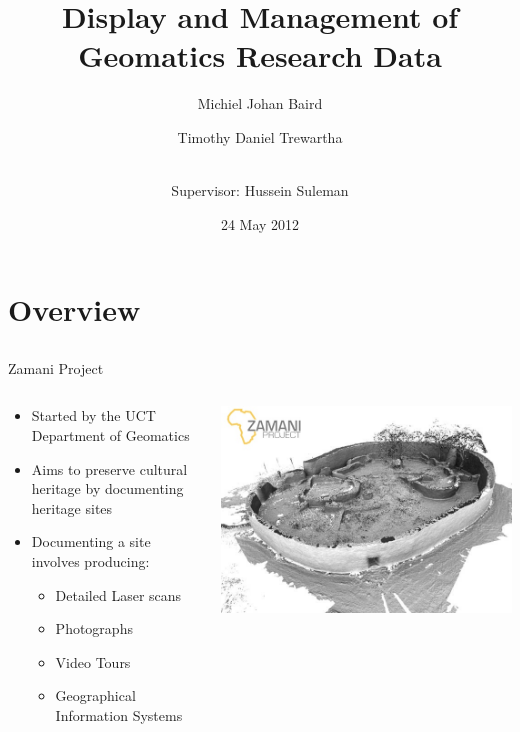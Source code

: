 \documentclass{beamer}
\title[Display and Management]{Display and Management of Geomatics Research Data}
\author{Michiel Johan Baird \and
    Timothy Daniel Trewartha \and
   \\  Supervisor: Hussein Suleman}
\date{24 May 2012}
\begin{document}
\begin{frame}
    \titlepage
\end{frame}

\section{Overview}
\subsection{}
\begin{frame}{Zamani Project}
\begin{columns}
\begin{column}{.65\linewidth}
\begin{itemize}
    \item Started by the UCT Department of Geomatics
    \item Aims to preserve cultural heritage by documenting heritage sites
    \item Documenting a site involves producing:
    \begin{itemize}
    \item Detailed Laser scans
    \item Photographs
    \item Video Tours
    \item Geographical Information Systems
    \end{itemize}
\end{itemize}
\end{column}
\begin{column}{.35\linewidth}
\includegraphics[width=\linewidth]{images/zamani1.jpg} \\

\end{column}
\end{columns}
\end{frame}
\end{document}
